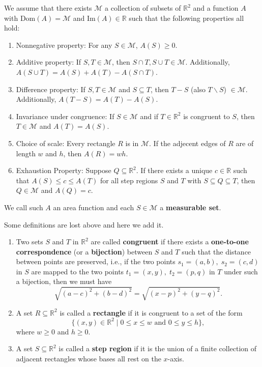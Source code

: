 	\begin{definitionenv}
		We assume that there exists $\mathscr{M}$ a collection of subsets of $\mathbb{R}^2$ and a function $A$ with $\mathrm{Dom}(A)=\mathscr{M}$ and $\mathrm{Im}(A)\in \mathbb{R}$ such that the following properties all hold:
		\begin{enumerate}
			\item Nonnegative property: For any $S\in \mathscr{M}$, $A(S)\ge 0$.
			\item Additive property: If $S,T \in \mathscr{M}$, then $S\cap T,S\cup T \in \mathscr{M}$. Additionally, $A(S\cup T)=A(S)+A(T)-A(S\cap T)$.
			\item Difference property: If $S,T \in \mathscr{M}$ and $S \subseteq T$, then $T-S$ (also $T\backslash S$) $\in \mathscr{M}$. Additionally, $A(T-S)=A(T)-A(S)$.
			\item Invariance under congruence: If $S\in \mathscr{M}$ and if $T\in \mathbb{R}^2$ is congruent to $S$, then $T \in \mathscr{M}$ and $A(T)=A(S)$.
			\item Choice of scale: Every rectangle $R$ is in $\mathscr{M}$. If the adjecent edges of $R$ are of length $w$ and $h$, then $A(R)=wh$.
			\item Exhaustion Property: Suppose $Q\subseteq \mathbb{R}^2$. If there exists a unique $c\in \mathbb{R}$ such that $A(S)\le c \le A(T)$ for all step regions $S$ and $T$ with $S\subseteq Q \subseteq T$, then $Q\in \mathscr{M}$ and $A(Q)=c$.
		\end{enumerate}
		We call such $A$ an area function and each $S\in \mathscr{M}$ a \textbf{measurable set}.
	\end{definitionenv}
	\begin{definitionenv}[Additional] Some definitions are lost above and here we add it.
		\begin{enumerate}
			\item Two sets $S$ and $T$ in $\mathbb{R}^2$ are called \textbf{congruent} if there exists a \textbf{one-to-one correspondence} (or a \textbf{bijection}) between $S$ and $T$ such that the distance between points are preserved, i.e., if the two points 
			$s_1 = (a,b), \; s_2 = (c,d)$ in $S$ are mapped to the two points 
			$t_1 = (x,y), \; t_2 = (p,q)$ in $T$ under such a bijection, then we must have
			\[
			\sqrt{(a - c)^2 + (b - d)^2} = \sqrt{(x - p)^2 + (y - q)^2}.
			\]
			\item A set $R \subseteq \mathbb{R}^2$ is called a \textbf{rectangle} if it is congruent to a set of the form
			\[
			\{ (x,y) \in \mathbb{R}^2 \mid 0 \le x \le w \text{ and } 0 \le y \le h \},
			\]
			where $w \ge 0$ and $h \ge 0$.
			\item A set $S \subseteq \mathbb{R}^2$ is called a \textbf{step region} if it is the union of a finite collection of 
			adjacent rectangles whose bases all rest on the $x$-axis.
		\end{enumerate}
	\end{definitionenv}
